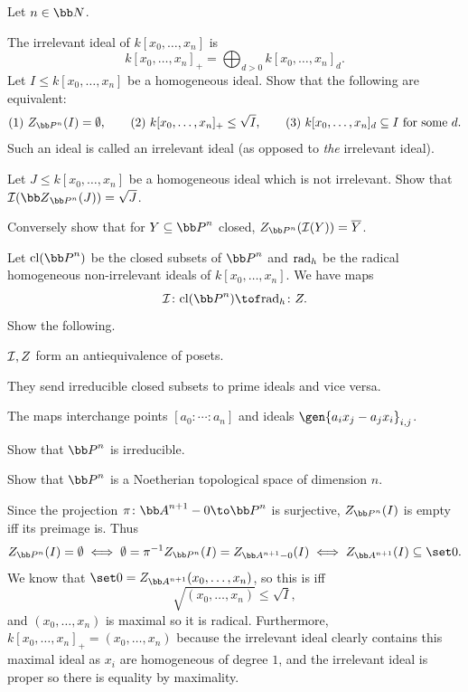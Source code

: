 \bprob

    Let $n\in\bN$.
    \benum
        \item The {\emphcolor irrelevant ideal} of $k[x_0,\dots,x_n]$ is
        $$ k[x_0,\dots,x_n]_+=\bigoplus_{d>0}k[x_0,\dots,x_n]_d . $$
        Let $I\leq k[x_0,\dots,x_n]$ be a homogeneous ideal.
        Show that the following are equivalent:
        $$ (1)\ Z_{\bP^n}(I)=\emptyset,\qquad (2)\ k[x_0,\dots,x_n]_+ \leq \sqrt I,\qquad
        (3)\ k[x_0,\dots,x_n]_d \subseteq I\hbox{ for some $d$} . $$
        Such an ideal is called an {\emphcolor irrelevant ideal} (as opposed to {\it the\/} irrelevant ideal).
        \item Let $J\leq k[x_0,\dots,x_n]$ be a homogeneous ideal which is not irrelevant.
        Show that $\I(\bZ_{\bP^n}(J))=\sqrt J$.

        Conversely show that for $Y\subseteq\bP^n$ closed, $Z_{\bP^n}(\I(Y))=\cl Y$.
        \item Let $\cll(\bP^n)$ be the closed subsets of $\bP^n$ and ${\rm rad}_h$ be the radical homogeneous non-irrelevant ideals of
        $k[x_0,\dots,x_n]$.
        We have maps
        $$ \I\colon\cll(\bP^n) \tof \rad_h\colon Z . $$
        Show the following.
        \benum
            \item ${{\cal I}},Z$ form an antiequivalence of posets.
            \item They send irreducible closed subsets to prime ideals and vice versa.
            \item The maps interchange points $[a_0:\cdots:a_n]$ and ideals $\gen{a_ix_j-a_jx_i}_{i,j}$.
        \eenum

        \item Show that $\bP^n$ is irreducible.

        \item Show that $\bP^n$ is a Noetherian topological space of dimension $n$.
    \eenum

\eprob

\benum
    \item Since the projection $\pi\colon\bA^{n+1}-0\to\bP^n$ is surjective, $Z_{\bP^n}(I)$ is empty iff its preimage is.
    Thus
    $$ Z_{\bP^n}(I) = \emptyset \iff \emptyset = \pi^{-1}Z_{\bP^n}(I) = Z_{\bA^{n+1}-0}(I) \iff Z_{\bA^{n+1}}(I) \subseteq \set0 . $$
    We know that $\set 0 = Z_{\bA^{n+1}}(x_0,\dots,x_n)$, so this is iff
    $$ \sqrt{(x_0,\dots,x_n)} \leq \sqrt I , $$
    and $(x_0,\dots,x_n)$ is maximal so it is radical.
    Furthermore, $k[x_0,\dots,x_n]_+=(x_0,\dots,x_n)$ because the irrelevant ideal clearly contains this maximal ideal as $x_i$ are homogeneous
    of degree $1$, and the irrelevant ideal is proper so there is equality by maximality.

